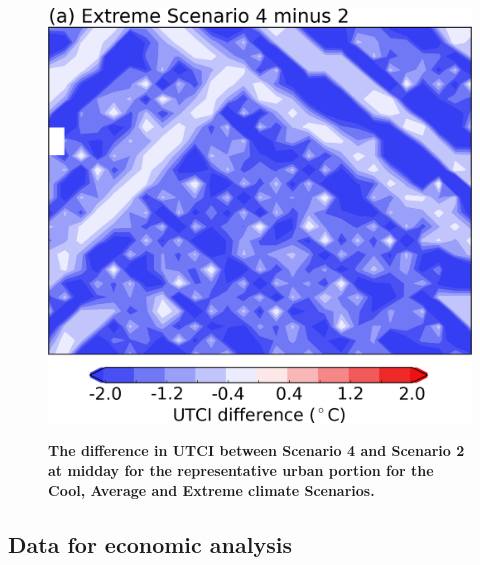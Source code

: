 \documentclass[final,3p,times,authoryear]{elsarticle}
\begin{document}
\begin{figure}[!htbp]
~
\includegraphics[scale=0.30]{images/fig4c} 
\caption{\bf The difference in UTCI between Scenario 4 and Scenario 2 at midday for the representative urban portion for the Cool, Average and Extreme climate Scenarios.}    
 \label{fig:fig4} 
\end{figure} 


\subsection{Data for economic analysis}\label{sec:6}
\end{document}
